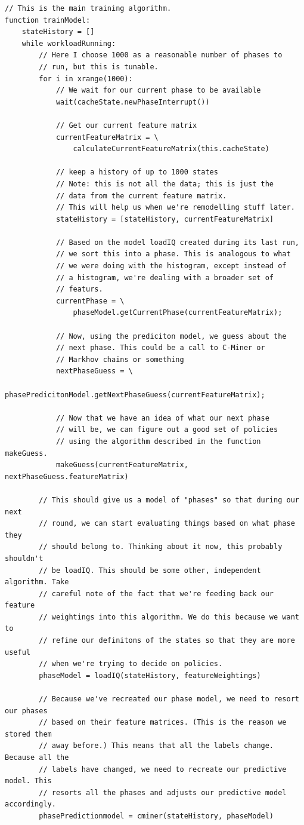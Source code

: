 \documentclass[11pt]{article}
\numberwithin{figure}{section}
\begin{document}
\begin{scriptsize}
\begin{lstlisting}
// This is the main training algorithm.
function trainModel:
	stateHistory = []
	while workloadRunning:
		// Here I choose 1000 as a reasonable number of phases to
		// run, but this is tunable.
		for i in xrange(1000):
			// We wait for our current phase to be available
			wait(cacheState.newPhaseInterrupt())
			
			// Get our current feature matrix
			currentFeatureMatrix = \
				calculateCurrentFeatureMatrix(this.cacheState)
			
			// keep a history of up to 1000 states
			// Note: this is not all the data; this is just the
			// data from the current feature matrix.
			// This will help us when we're remodelling stuff later.
			stateHistory = [stateHistory, currentFeatureMatrix]
			
			// Based on the model loadIQ created during its last run,
			// we sort this into a phase. This is analogous to what
			// we were doing with the histogram, except instead of
			// a histogram, we're dealing with a broader set of
			// featurs.
			currentPhase = \
				phaseModel.getCurrentPhase(currentFeatureMatrix);
			
			// Now, using the prediciton model, we guess about the
			// next phase. This could be a call to C-Miner or
			// Markhov chains or something
			nextPhaseGuess = \
				phasePredicitonModel.getNextPhaseGuess(currentFeatureMatrix);
			
			// Now that we have an idea of what our next phase
			// will be, we can figure out a good set of policies
			// using the algorithm described in the function makeGuess.
			makeGuess(currentFeatureMatrix, nextPhaseGuess.featureMatrix)
		
		// This should give us a model of "phases" so that during our next
		// round, we can start evaluating things based on what phase they
		// should belong to. Thinking about it now, this probably shouldn't
		// be loadIQ. This should be some other, independent algorithm. Take
		// careful note of the fact that we're feeding back our feature 
		// weightings into this algorithm. We do this because we want to
		// refine our definitons of the states so that they are more useful
		// when we're trying to decide on policies.
		phaseModel = loadIQ(stateHistory, featureWeightings)
		
		// Because we've recreated our phase model, we need to resort our phases
		// based on their feature matrices. (This is the reason we stored them 
		// away before.) This means that all the labels change. Because all the
		// labels have changed, we need to recreate our predictive model. This
		// resorts all the phases and adjusts our predictive model accordingly.
		phasePredictionmodel = cminer(stateHistory, phaseModel)
		\end{lstlisting}
		\end{scriptsize}
\end{document}

